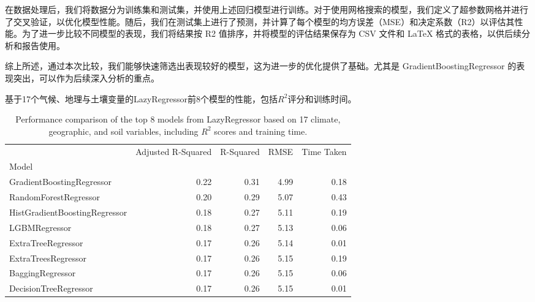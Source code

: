 \documentclass[AutoFakeBold]{LZUThesis-PgD&PhD}
\begin{document}
	在数据处理后，我们将数据分为训练集和测试集，并使用上述回归模型进行训练。对于使用网格搜索的模型，我们定义了超参数网格并进行了交叉验证，以优化模型性能。随后，我们在测试集上进行了预测，并计算了每个模型的均方误差（MSE）和决定系数（R2）以评估其性能。为了进一步比较不同模型的表现，我们将结果按 R2 值排序，并将模型的评估结果保存为 CSV 文件和 LaTeX 格式的表格，以供后续分析和报告使用。
	
	综上所述，通过本次比较，我们能够快速筛选出表现较好的模型，这为进一步的优化提供了基础。尤其是 GradientBoostingRegressor 的表现突出，可以作为后续深入分析的重点。
	
	
	
	\begin{table}[H]
		\centering
		\caption{基于17个气候、地理与土壤变量的LazyRegressor前8个模型的性能，包括$R^2$评分和训练时间。}
		\caption*{Performance comparison of the top 8 models from LazyRegressor based on 17 climate, geographic, and soil variables, including $R^2$ scores and training time.}
		
		\begin{tabular}{lrrrr}
			\toprule
			& Adjusted R-Squared & R-Squared & RMSE & Time Taken \\
			Model &  &  &  &  \\
			\midrule
			GradientBoostingRegressor & 0.22 & 0.31 & 4.99 & 0.18 \\
			RandomForestRegressor & 0.20 & 0.29 & 5.07 & 0.43 \\
			HistGradientBoostingRegressor & 0.18 & 0.27 & 5.11 & 0.19 \\
			LGBMRegressor & 0.18 & 0.27 & 5.13 & 0.06 \\
			ExtraTreeRegressor & 0.17 & 0.26 & 5.14 & 0.01 \\
			ExtraTreesRegressor & 0.17 & 0.26 & 5.15 & 0.19 \\
			BaggingRegressor & 0.17 & 0.26 & 5.15 & 0.06 \\
			DecisionTreeRegressor & 0.17 & 0.26 & 5.15 & 0.01 \\
			\bottomrule
		\end{tabular}
		\label{tab:models_performance}
	\end{table}
	
\end{document}
